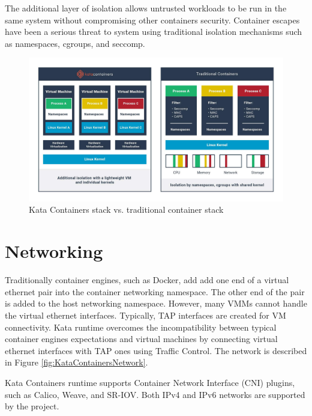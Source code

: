 The additional layer of isolation allows untrusted workloads to be run in the same system without compromising other containers security. Container escapes \cite{CVE-2020-14386}\cite{CVE-2019-5736} have been a serious threat to system using traditional isolation mechanisms such as namespaces, cgroups, and seccomp.

\begin{figure}[ht]
  \begin{center}
    \includegraphics[width=13.5cm]{images/KataContainersStack.jpg}
    \caption{Kata Containers stack vs. traditional container stack \cite{KataContainers}}
    \label{fig:KataContainersStack}
  \end{center}
\end{figure} 

\section{Networking}

Traditionally container engines, such as Docker, add add one end of a virtual ethernet pair into the container networking namespace. The other end of the pair is added to the host networking namespace. However, many VMMs cannot handle the virtual ethernet interfaces. Typically, TAP interfaces are created for VM connectivity. Kata runtime overcomes the incompatibility between typical container engines expectations and virtual machines by connecting virtual ethernet interfaces with TAP ones using Traffic Control. The network is described in Figure \ref{fig:KataContainersNetwork}. \cite{KataContainersArchitecture}

Kata Containers runtime supports Container Network Interface (CNI) \cite{CNI} plugins, such as Calico, Weave, and SR-IOV. Both IPv4 and IPv6 networks are supported by the project.

